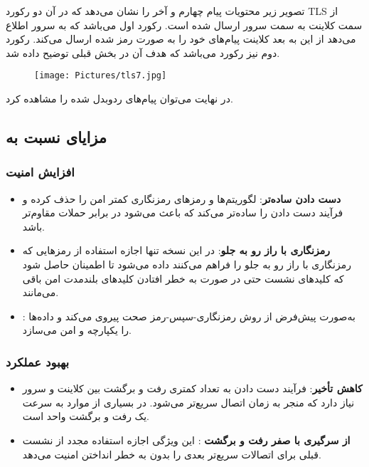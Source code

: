 \documentclass{report}
\begin{document}
تصویر زیر محتویات پیام چهارم و آخر را نشان می‌دهد که در آن دو رکورد TLS از سمت کلاینت به سمت سرور ارسال شده است. رکورد اول  می‌باشد که به سرور اطلاع می‌دهد از این به بعد کلاینت پیام‌های خود را به صورت رمز شده ارسال می‌کند. رکورد دوم نیز رکورد  می‌باشد که هدف آن در بخش قبلی توضیح داده شد.
\begin{figure}[H]
	\centering
	\texttt{[image: Pictures/tls7.jpg]}
	\label{tls7}
\end{figure}

در نهایت می‌توان پیام‌های  ردوبدل شده را مشاهده کرد.

\subsection*{مزایای  نسبت به }

\subsubsection*{افزایش امنیت}
\begin{itemize}[noitemsep]
	\item \textbf{دست دادن ساده‌تر}:
	 لگوریتم‌ها و رمزهای رمزنگاری کمتر امن را حذف کرده و فرآیند دست دادن را ساده‌تر می‌کند که باعث می‌شود در برابر حملات مقاوم‌تر باشد.
	\item \textbf{رمزنگاری با راز رو به جلو}:
	در این نسخه تنها اجازه استفاده از رمزهایی که رمزنگاری با راز رو به جلو را فراهم می‌کنند داده می‌شود تا اطمینان حاصل شود که کلیدهای نشست حتی در صورت به خطر افتادن کلیدهای بلندمدت امن باقی می‌مانند.
	\item \textbf{}:
	 به‌صورت پیش‌فرض از روش رمزنگاری-سپس-رمز صحت پیروی می‌کند و داده‌ها را یکپارچه و امن می‌سازد.
\end{itemize}

\subsubsection*{بهبود عملکرد}
\begin{itemize}[noitemsep]
	\item \textbf{کاهش تأخیر}:
	فرآیند دست دادن به تعداد کمتری رفت و برگشت بین کلاینت و سرور نیاز دارد که منجر به زمان اتصال سریع‌تر می‌شود. در بسیاری از موارد به سرعت یک رفت و برگشت واحد است.
	\item \textbf{از سرگیری با صفر رفت و برگشت }:
	این ویژگی اجازه استفاده مجدد از نشست قبلی برای اتصالات سریع‌تر بعدی را بدون به خطر انداختن امنیت می‌دهد.
\end{itemize}
\end{document}
